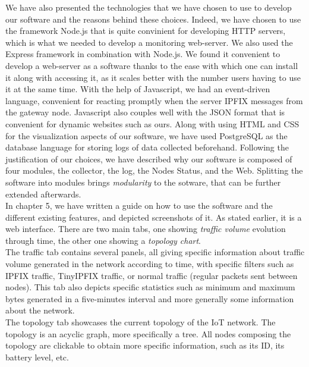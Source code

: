 We have also presented the technologies that we have chosen to use to develop our software and the reasons behind these choices. Indeed, we have chosen to use the framework Node.js that is quite convinient for developing HTTP servers, which is what we needed to develop a monitoring web-server. We also used the Express framework in combination with Node.js. We found it convenient to develop a web-server as a software thanks to the ease with which one can install it along with accessing it, as it scales better with the number users having to use it at the same time. With the help of Javascript, we had an event-driven language, convenient for reacting promptly when the server IPFIX messages from the gateway node. Javascript also couples well with the JSON format that is convenient for dynamic websites such as ours. Along with using HTML and CSS for the visualization aspects of our software, we have used PostgreSQL as the database language for storing logs of data collected beforehand. Following the justification of our choices, we have described why our software is composed of four modules, the collector, the log, the Nodes Status, and the Web. Splitting the software into modules brings \textit{modularity} to the sotware, that can be further extended afterwards.\\

In chapter 5, we have written a guide on how to use the software and the different existing features, and depicted screenshots of it. As stated earlier, it is a web interface. There are two main tabs, one showing \textit{traffic volume} evolution through time, the other one showing a \textit{topology chart}. \\

The traffic tab contains several panels, all giving specific information about traffic volume generated in the network according to time, with specific filters such as IPFIX traffic, TinyIPFIX traffic, or normal traffic (regular packets sent between nodes). This tab also depicts specific statistics such as minimum and maximum bytes generated in a five-minutes interval and more generally some information about the network. \\

The topology tab showcases the current topology of the IoT network. The topology is an acyclic graph, more specifically a tree. All nodes composing the topology are clickable to obtain more specific information, such as its ID, its battery level, etc.\\

